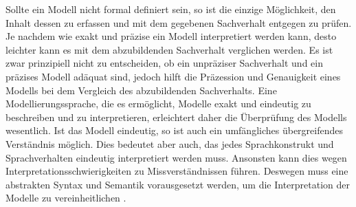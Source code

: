 Sollte ein Modell nicht formal definiert sein, so ist die einzige Möglichkeit, den Inhalt dessen zu erfassen und mit dem gegebenen Sachverhalt entgegen zu prüfen. Je nachdem wie exakt und präzise ein Modell interpretiert werden kann, desto leichter kann es mit dem abzubildenden Sachverhalt verglichen werden. Es ist zwar prinzipiell nicht zu entscheiden, ob ein unpräziser Sachverhalt und ein präzises Modell adäquat sind, jedoch hilft die Präzession und Genauigkeit eines Modells bei dem Vergleich des abzubildenden Sachverhalts. Eine Modellierungssprache, die es ermöglicht, Modelle exakt und eindeutig zu beschreiben
und zu interpretieren, erleichtert daher die Überprüfung des Modells wesentlich. Ist das Modell eindeutig, so ist auch ein umfängliches übergreifendes Verständnis möglich. Dies bedeutet aber auch, das jedes Sprachkonstrukt und Sprachverhalten eindeutig interpretiert werden muss. Ansonsten kann dies wegen Interpretationsschwierigkeiten zu Missverständnissen führen. Deswegen muss eine abstrakten Syntax und Semantik vorausgesetzt werden, um die Interpretation der Modelle zu vereinheitlichen \cite[35F]{Frank_1997}.
